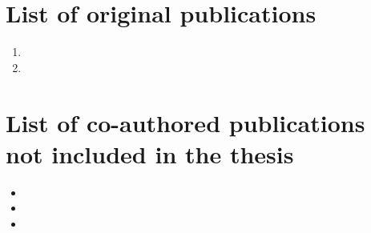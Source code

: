 \begingroup
\let\clearpage\relax

\chapter*{List of original publications}

\nobibliography*

\begin{enumerate}[I]

\item{}
\item{}

\end{enumerate}

\newpage

\endgroup

\begingroup
\let\clearpage\relax

\chapter*{List of co-authored publications not included in the thesis}

\begin{itemize}

\item{}
\item{}
\item{}

\end{itemize}
\newpage

\endgroup